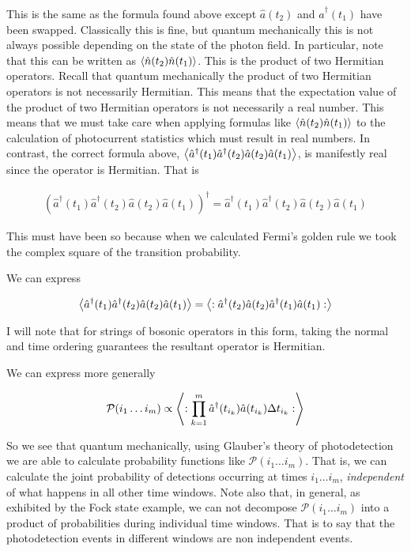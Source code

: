 \documentclass[12pt]{article}
\begin{document}
This is the same as the formula found above except $\hat{a}(t_2)$ and $\hat{a}^{\dag}(t_1)$ have been swapped. Classically this is fine, but quantum mechanically this is not always possible depending on the state of the photon field. 
In particular, note that this can be written as $\Braket{\hat{n}(t_2)\hat{n}(t_1)}$. This is the product of two Hermitian operators. Recall that quantum mechanically the product of two Hermitian operators is not necessarily Hermitian. This means that the expectation value of the product of two Hermitian operators is not necessarily a real number. This means that we must take care when applying formulas like $\Braket{\hat{n}(t_2)\hat{n}(t_1)}$ to the calculation of photocurrent statistics which must result in real numbers. In contrast, the correct formula above, $\Braket{\hat{a}^{\dag}(t_1)\hat{a}^{\dag}(t_2)\hat{a}(t_2)\hat{a}(t_1)}$, is manifestly real since the operator is Hermitian. That is 

\begin{align}
\left(\hat{a}^{\dag}(t_1)\hat{a}^{\dag}(t_2)\hat{a}(t_2)\hat{a}(t_1)\right)^{\dag} = \hat{a}^{\dag}(t_1)\hat{a}^{\dag}(t_2)\hat{a}(t_2)\hat{a}(t_1)
\end{align}

This must have been so because when we calculated Fermi's golden rule we took the complex square of the transition probability.

We can express

\begin{align}
\Braket{\hat{a}^{\dag}(t_1)\hat{a}^{\dag}(t_2)\hat{a}(t_2)\hat{a}(t_1)} = \Braket{:\hat{a}^{\dag}(t_2)\hat{a}(t_2) \hat{a}^{\dag}(t_1)\hat{a}(t_1):}
\end{align}

I will note that for strings of bosonic operators in this form, taking the normal and time ordering guarantees the resultant operator is Hermitian. 

We can express more generally

\begin{align}
\mathcal{P}(i_1 \ldots i_m) \propto \Braket{:\prod_{k=1}^m \hat{a}^{\dag}(t_{i_k})\hat{a}(t_{i_k})\Delta t_{i_k} :}
\end{align}

So we see that quantum mechanically, using Glauber's theory of photodetection we are able to calculate probability functions like $\mathcal{P}(i_1\ldots i_m)$. That is, we can calculate the joint probability of detections occurring at times $i_1 \ldots i_m$, \textit{independent} of what happens in all other time windows. Note also that, in general, as exhibited by the Fock state example, we can not decompose $\mathcal{P}(i_1 \ldots i_m)$ into a product of probabilities during individual time windows. That is to say that the photodetection events in different windows are non independent events.
\end{document}
